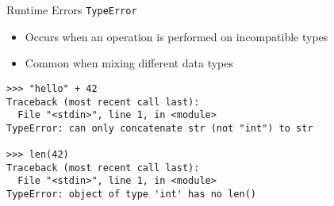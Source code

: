\documentclass[aspectratio=169]{beamer}
\begin{document}
\begin{frame}[fragile]{Runtime Errors}
    \texttt{TypeError}
    \begin{itemize}[<+->]
        \item Occurs when an operation is performed on incompatible types
        \item Common when mixing different data types
    \end{itemize}
    \pause
    \begin{lstlisting}
>>> "hello" + 42
Traceback (most recent call last):
  File "<stdin>", line 1, in <module>
TypeError: can only concatenate str (not "int") to str

>>> len(42)
Traceback (most recent call last):
  File "<stdin>", line 1, in <module>
TypeError: object of type 'int' has no len()
    \end{lstlisting}
\end{frame}
\end{document}
